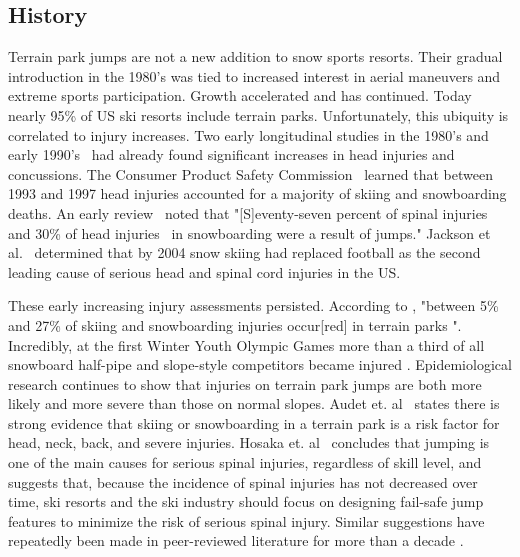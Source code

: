 \documentclass{article}
\begin{document}
\subsection{History}
%
Terrain park jumps are not a new addition to snow sports resorts. Their gradual
introduction in the 1980's was tied to increased interest in aerial maneuvers
and extreme sports participation. Growth accelerated and has continued.  Today
nearly 95\% of US ski resorts include terrain parks. Unfortunately, this
ubiquity is correlated to injury increases.  Two early longitudinal studies  in
the 1980's and early 1990's~\cite{Diebert1998,Furrer1995} had already found
significant increases in head injuries and concussions. The Consumer Product
Safety Commission~\cite{CPSC1999} learned that between 1993 and 1997 head injuries accounted
for a majority of skiing
and snowboarding deaths. An early review~\cite{Koehle2002} noted that "[S]eventy-seven
percent of spinal injuries~\cite{Tarazi1999} and 30\% of head
injuries~\cite{Fukada2001}
in snowboarding were a result of jumps." Jackson et al.~\cite{Jackson2004}
determined that by 2004 snow skiing had replaced football as the second leading
cause of serious head and spinal cord injuries in the US.

These early increasing injury assessments persisted. According to
\cite{Russell2014}, "between 5\% and 27\% of skiing and snowboarding injuries
occur[red] in terrain parks \cite{Bridges2003, Goulet2007,  Moffat2009,
Greve2009, Brooks2010,Ruedl2013}".  Incredibly, at the first Winter Youth
Olympic Games more than a third of all snowboard half-pipe and slope-style
competitors became injured \cite{Ruedl2012}. Epidemiological research
continues to show \cite{Carus2016,Audet2019, Hosaka2020} that injuries on
terrain park jumps are both more likely and more severe than those on normal
slopes. Audet et. al~\cite{Audet2019} states  there is strong evidence that
skiing or snowboarding in a terrain park is a risk factor for head, neck,
back, and severe injuries. Hosaka et. al~\cite{Hosaka2020} concludes that
jumping is one of the main causes for serious spinal injuries, regardless of
skill level, and suggests that, because the incidence of spinal injuries has
not decreased over time, ski resorts and the ski industry should focus on
designing fail-safe jump features to minimize the risk of serious spinal
injury.  Similar suggestions have repeatedly been made in peer-reviewed
literature for more than a decade
\cite{Hubbard2009,Swedberg2012,McNeil2012,McNeil2012a,McNeil2015,Hubbard2015,
Levy2015,Petrone2017,Moore2018}.
\end{document}
